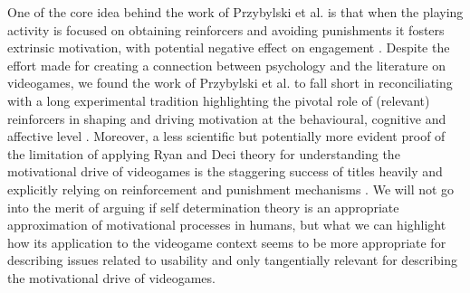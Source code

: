 One of the core idea behind the work of Przybylski et al. is that when the playing activity is focused on obtaining reinforcers and avoiding punishments it fosters extrinsic motivation, with potential negative effect on engagement \cite{przybylski2010motivational}.  Despite the effort made for creating a connection between psychology and the literature on videogames, we found the work of Przybylski et al. to fall short in reconciliating with a long experimental tradition highlighting the pivotal role of (relevant) reinforcers in shaping and driving motivation at the behavioural, cognitive and affective level \cite{skinner1953science,schultz1997neural,berridge2004motivation}. Moreover, a less scientific but potentially more evident proof of the limitation of applying Ryan and Deci theory for understanding the motivational drive of videogames is the staggering success of titles heavily and explicitly relying on reinforcement and punishment mechanisms \cite{darksouls,candyc}. We will not go into the merit of arguing if self determination theory is an appropriate approximation of motivational processes in humans, but what we can highlight how its application to the videogame context seems to be more appropriate for describing issues related to usability and only tangentially relevant for describing the motivational drive of videogames.


